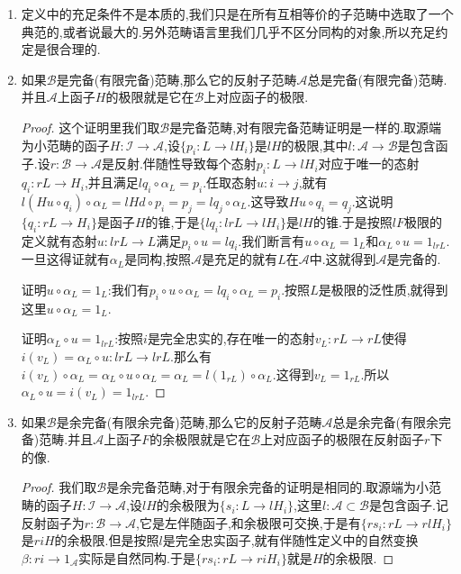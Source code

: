 \begin{enumerate}
	\item 定义中的充足条件不是本质的,我们只是在所有互相等价的子范畴中选取了一个典范的,或者说最大的.另外范畴语言里我们几乎不区分同构的对象,所以充足约定是很合理的.
	\item 如果$\mathscr{B}$是完备(有限完备)范畴,那么它的反射子范畴$\mathscr{A}$总是完备(有限完备)范畴.并且$\mathscr{A}$上函子$H$的极限就是它在$\mathscr{B}$上对应函子的极限.
	\begin{proof}
		
		这个证明里我们取$\mathscr{B}$是完备范畴,对有限完备范畴证明是一样的.取源端为小范畴的函子$H:\mathscr{I}\to\mathscr{A}$,设$\{p_i:L\to lH_i\}$是$lH$的极限,其中$l:\mathscr{A}\to\mathscr{B}$是包含函子.设$r:\mathscr{B}\to\mathscr{A}$是反射.伴随性导致每个态射$p_i:L\to lH_i$对应于唯一的态射$q_i:rL\to H_i$,并且满足$lq_i\circ\alpha_L=p_i$.任取态射$u:i\to j$,就有$l(Hu\circ q_i)\circ\alpha_L=lHd\circ p_i=p_j=lq_j\circ\alpha_L$.这导致$Hu\circ q_i=q_j$.这说明$\{q_i:rL\to H_i\}$是函子$H$的锥,于是$\{lq_i:lrL\to lH_i\}$是$lH$的锥.于是按照$lF$极限的定义就有态射$u:lrL\to L$满足$p_i\circ u=lq_i$.我们断言有$u\circ\alpha_L=1_L$和$\alpha_L\circ u=1_{lrL}$.一旦这得证就有$\alpha_L$是同构,按照$\mathscr{A}$是充足的就有$L$在$\mathscr{A}$中.这就得到$\mathscr{A}$是完备的.
		
		\qquad
		
		证明$u\circ\alpha_L=1_L$:我们有$p_i\circ u\circ\alpha_L=lq_i\circ\alpha_L=p_i$.按照$L$是极限的泛性质,就得到这里$u\circ\alpha_L=1_L$.
		
		\qquad
		
		证明$\alpha_L\circ u=1_{lrL}$:按照$i$是完全忠实的,存在唯一的态射$v_L:rL\to rL$使得$i(v_L)=\alpha_L\circ u:lrL\to lrL$.那么有$i(v_L)\circ\alpha_L=\alpha_L\circ u\circ\alpha_L=\alpha_L=l(1_{rL})\circ\alpha_L$.这得到$v_L=1_{rL}$.所以$\alpha_L\circ u=i(v_L)=1_{lrL}$.
	\end{proof}
    \item 如果$\mathscr{B}$是余完备(有限余完备)范畴,那么它的反射子范畴$\mathscr{A}$总是余完备(有限余完备)范畴.并且$\mathscr{A}$上函子$F$的余极限就是它在$\mathscr{B}$上对应函子的极限在反射函子$r$下的像.
    \begin{proof}
    	
    	我们取$\mathscr{B}$是余完备范畴,对于有限余完备的证明是相同的.取源端为小范畴的函子$H:\mathscr{I}\to\mathscr{A}$,设$lH$的余极限为$\{s_i:L\to lH_i\}$,这里$l:\mathscr{A}\subset\mathscr{B}$是包含函子.记反射函子为$r:\mathscr{B}\to\mathscr{A}$,它是左伴随函子,和余极限可交换,于是有$\{rs_i:rL\to rlH_i\}$是$riH$的余极限.但是按照$l$是完全忠实函子,就有伴随性定义中的自然变换$\beta:ri\to 1_{\mathscr{A}}$实际是自然同构.于是$\{rs_i:rL\to riH_i\}$就是$H$的余极限.
    \end{proof}
\end{enumerate}
\newpage
